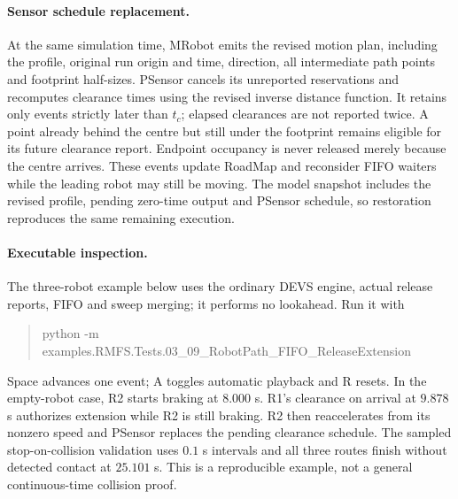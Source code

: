 \documentclass[11pt,a4paper]{article}
\theoremstyle{remark}
\begin{document}
\paragraph{Sensor schedule replacement.}
At the same simulation time, MRobot emits the revised motion plan, including
the profile, original run origin and time, direction, all intermediate path
points and footprint half-sizes. PSensor cancels its unreported reservations
and recomputes clearance times using the revised inverse distance function.
It retains only events strictly later than $t_c$; elapsed clearances are not
reported twice. A point already behind the centre but still under the footprint
remains eligible for its future clearance report. Endpoint occupancy is never
released merely because the centre arrives. These events update RoadMap and
reconsider FIFO waiters while the leading robot may still be moving.
The model snapshot includes the revised profile, pending zero-time output and
PSensor schedule, so restoration reproduces the same remaining execution.

\paragraph{Executable inspection.}
The three-robot example below uses the ordinary DEVS engine,
actual release reports, FIFO and sweep merging; it performs no lookahead.
Run it with
\begin{quote}\small\ttfamily
python -m examples.RMFS.Tests.03\_09\_RobotPath\_FIFO\_ReleaseExtension
\end{quote}
Space advances one event; A toggles automatic playback and R resets.
In the empty-robot case, R2 starts braking at $8.000$ s. R1's clearance on
arrival at $9.878$ s authorizes extension while R2 is still braking.
R2 then reaccelerates from its nonzero speed and PSensor replaces the pending
clearance schedule. The sampled stop-on-collision validation uses $0.1$ s
intervals and all three routes finish without detected contact at $25.101$ s.
This is a reproducible example, not a general continuous-time collision proof.
\end{document}
